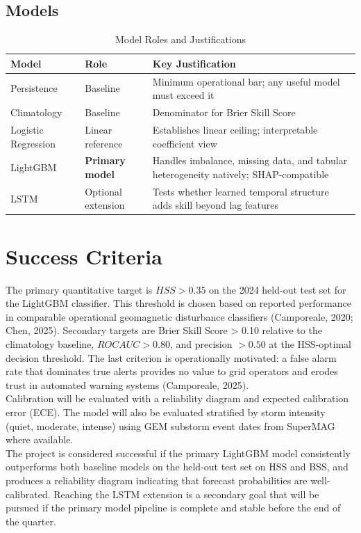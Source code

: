 \documentclass{article}
\begin{document}
\subsection*{Models}
\begin{table}[h!]
\centering
\begin{tabular}{|l|l|p{8cm}|}
\hline
\textbf{Model} & \textbf{Role} & \textbf{Key Justification} \\ \hline
Persistence & Baseline & Minimum operational bar; any useful model must exceed it \\ \hline
Climatology & Baseline & Denominator for Brier Skill Score \\ \hline
Logistic Regression & Linear reference & Establishes linear ceiling; interpretable coefficient view \\ \hline
LightGBM & \textbf{Primary model} & Handles imbalance, missing data, and tabular heterogeneity natively; SHAP-compatible \\ \hline
LSTM & Optional extension & Tests whether learned temporal structure adds skill beyond lag features \\ \hline
\end{tabular}
\caption{Model Roles and Justifications}
\end{table}

\section*{Success Criteria}
The primary quantitative target is $HSS > 0.35$ on the 2024 held-out test set for the LightGBM classifier. This threshold is chosen based on reported performance in comparable operational geomagnetic disturbance classifiers (Camporeale, 2020; Chen, 2025). Secondary targets are Brier Skill Score > 0.10 relative to the climatology baseline, $ROC AUC > 0.80$, and precision $> 0.50$ at the HSS-optimal decision threshold. The last criterion is operationally motivated: a false alarm rate that dominates true alerts provides no value to grid operators and erodes trust in automated warning systems (Camporeale, 2025). \\

\noindent Calibration will be evaluated with a reliability diagram and expected calibration error (ECE). The model will also be evaluated stratified by storm intensity (quiet, moderate, intense) using GEM substorm event dates from SuperMAG where available. \\

\noindent The project is considered successful if the primary LightGBM model consistently outperforms both baseline models on the held-out test set on HSS and BSS, and produces a reliability diagram indicating that forecast probabilities are well-calibrated. Reaching the LSTM extension is a secondary goal that will be pursued if the primary model pipeline is complete and stable before the end of the quarter.
\end{document}
